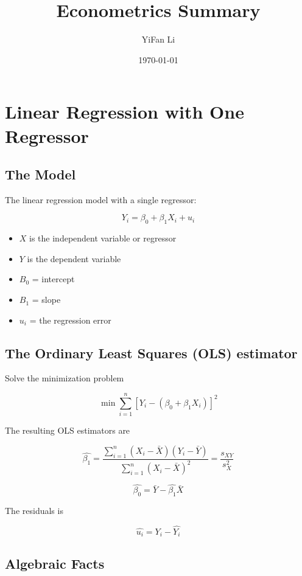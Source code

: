 \documentclass{article}
\title{Econometrics Summary}
\author{YiFan Li}
\date{\today}
\newcommand{\sumlimits}{\sum \limits _{i=1}^{n}}
\begin{document}
\maketitle
{}

\tableofcontents
\clearpage


\section{Linear Regression with One Regressor}

\subsection{The Model}

The linear regression model with a single regressor:

\[
	Y_i = \beta_0 + \beta_1 X_i + u_i
\]

\begin{itemize}
	\item $X$ is the independent variable or regressor
	\item $Y$ is the dependent variable
	\item $B_0$ = intercept
	\item $B_1$ = slope
	\item $u_i$ = the regression error
\end{itemize}

\subsection{The Ordinary Least Squares (OLS) estimator}

Solve the minimization problem

\[
	\min \sumlimits \left[Y_i - (\beta_0 + \beta_1 X_i)\right]^2
\]

The resulting OLS estimators are

\[
	\hat{\beta_1} =
	\dfrac{
		\sumlimits (X_i - \bar{X}) (Y_i - \bar{Y})
	}{
		\sumlimits (X_i - \bar{X})^2
	}
	= \dfrac{
		s_{XY}
	}{
		s^{2}_{X}
	}
\]

\[
	\hat{\beta_0} = \bar{Y} - \hat{\beta_1}\bar{X}
\]

The residuals is

\[
	\hat{u_i} = Y_i - \hat{Y_i}
\]

\subsection{Algebraic Facts}
\end{document}
